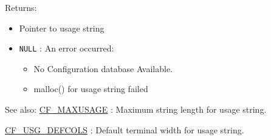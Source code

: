 \begin{Desc}
\item[Returns:]\begin{itemize}
\item Pointer to usage string\item {\tt NULL} : An error occurred: \begin{itemize}
\item No Configuration database Available.  \item malloc() for usage string failed\end{itemize}
\end{itemize}
\end{Desc}
\begin{Desc}
\item[See also:]\hyperlink{group__cflib__core_gd36d92b5077988734cdfeb0f47c0488e}{CF\_\-MAXUSAGE} : Maximum string length for usage string.  

\hyperlink{group__cflib__core_gc568df32f08baaff9c162521856c3ec7}{CF\_\-USG\_\-DEFCOLS} : Default terminal width for usage string.  \end{Desc}
